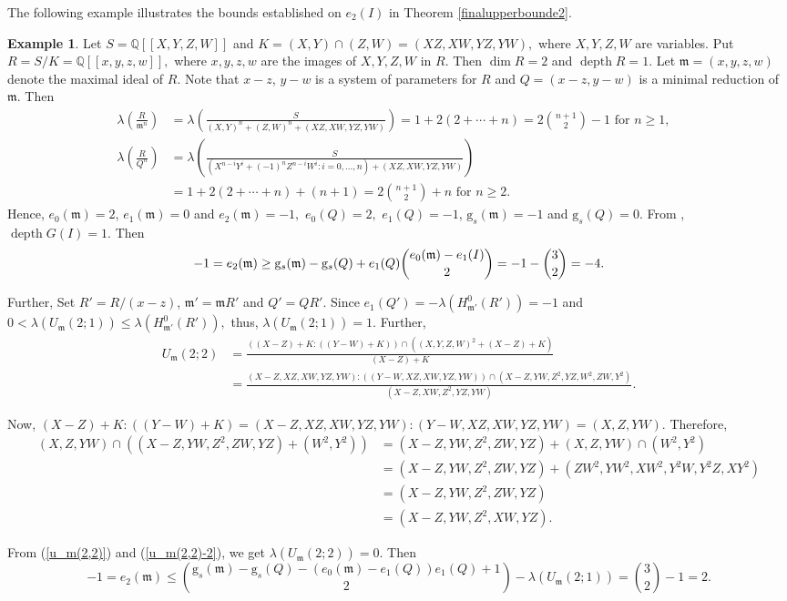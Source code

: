 \documentclass[reqno,a4paper,dvipsnames]{amsart}
\newcommand{\m}{\mathfrak{m} }
\newcommand{\depth}{\operatorname{depth}}
\theoremstyle{definition}
\newtheorem{example}[theorem]{Example}
\begin{document}
The following example illustrates the  bounds established on $e_{2}(I)$ in Theorem \ref{finalupperbounde2}. 

 \begin{example} \cite[Example 2.3]{sk} \label{optimalexample}
 Let $S=\mathbb Q[[X,Y,Z,W]]$ and $K = (X,Y)\cap(Z,W)= (XZ, XW, YZ, YW),$ where $X,Y,Z,W$ are variables. Put  $ R= S/K=\mathbb Q[[x,y,z,w]],$ where $x,y,z,w$ are  the images of  $X,Y,Z,W$ in $R.$ Then  $\dim R=2$  and $\depth R=1.$   Let $\m=(x,y,z,w)$ denote the maximal ideal of $R.$ Note that  $x-z$, $y-w$ is a system of parameters for $R$  and $Q=(x-z,y-w)$ is a minimal reduction of $\m.$  Then
 \begin{align*}
     \lambda \left( \frac{R}{\m^n }\right)
     &= \lambda \left( \frac{S} {(X,Y)^n + (Z,W)^n + (XZ, XW, YZ, YW)}\right)
     = 1 +   2(2 + \cdots + n)
     = 2 \binom{n+1}{2}-1 \text{ for } n\geq 1,\\ 
     \lambda \left( \frac{R}{Q^n }\right)
    & = \lambda \left( \frac{S} {(X^{n-i}Y^i +  (-1)^nZ^{n-i}W^i:i=0, \ldots,n) + (XZ, XW, YZ, YW)}\right)&\\
    & = 1 +  2(2 + \cdots + n) + (n+1)
     = 2 \binom{n+1}{2} +n  \text { for } n \geq 2. 
 \end{align*}
   Hence, $e_{0}(\m)=2$, $e_{1}(\m)=0$ and 
 $e_{2}(\m)=-1,$  $e_{0}(Q)=2,$  $e_{1}(Q)=-1$,  $\mathrm{g}_{s}(\m)=-1$  and $\mathrm{g}_{s}(Q)=0.$  From \cite[Corollary 2.9]{goto1980}, $\depth G(I)=1.$ Then
$$-1=e_{2}(\m) \geq  \mathrm{g}_{s}(\m)-\mathrm{g}_{s}(Q)+e_{1}(Q)\dbinom{e_{0}(\m)-e_{1}(I)}{2}=-1-\binom{3}{2}=-4.$$
 
 Further, Set $R'=R/(x-z)$, $\m'=\m R'$ and $Q'=QR'.$ Since $e_{1}(Q')=-\lambda(H^{0}_{\m'}(R'))=-1$ and
 $0<\lambda(U_{\m}(2;1))\leq \lambda(H^{0}_{\m'}(R')),$ thus, 
 $\lambda(U_{\m}(2;1))=1.$ Further,
\small{\begin{align}
    \label{u_m(2,2)} \nonumber
     U_{\m}(2;2) 
     &= \frac{ ((X-Z) + K: ((Y-W)  + K) )\cap ((X,Y,Z,W)^2 + (X-Z) + K)}{(X-Z) + K}\\
     &= \frac{  (X-Z, XZ, XW, YZ, YW): ((Y-W  , XZ, XW, YZ, YW) )\cap (X-Z, YW, Z^2, YZ, W^2,ZW,  Y^2)}{(X-Z,  XW, Z^2, YZ, YW)}.
\end{align}}

\normalsize
Now, $ (X-Z) + K: ((Y-W)  + K)=(X-Z, XZ, XW, YZ, YW): (Y-W  , XZ, XW, YZ, YW)=(X,Z, YW).$ Therefore, 
\footnotesize{\begin{align} \label{u_m(2,2)-2} \nonumber
    (X,Z, YW) \cap ((X-Z, YW, Z^2, ZW, YZ) +  (W^2,  Y^2))& =(X-Z, YW, Z^2, ZW, YZ) + (X,Z, YW) \cap (W^2,  Y^2)\\ \nonumber
  &  = (X-Z, YW, Z^2, ZW, YZ) + (ZW^2, YW^2, XW^2, Y^2W, Y^2Z, XY^2)\\ \nonumber
   & = (X-Z, YW, Z^2, ZW, YZ)\\
   &= (X-Z, YW, Z^2, XW, YZ). 
\end{align}}

\normalsize From (\ref{u_m(2,2)}) and (\ref{u_m(2,2)-2}), we get $\lambda(U_{\m}(2;2))=0.$
    Then $$-1=e_{2}(\m) \leq \binom{\mathrm{g}_s(\m) - \mathrm{g}_s(Q) - (e_{0}(\m)-e_{1}(Q))e_1(Q) + 1}{2}-\lambda(U_{\m}(2;1))=\binom{3}{2}-1=2.$$
  \end{example}
\end{document}
